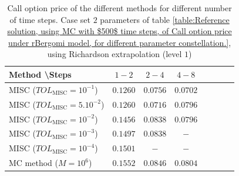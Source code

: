 \begin{table}[h!]
	\centering
	\begin{tabular}{l*{6}{c}r}
		Method \textbackslash  Steps    &$1-2$         & $2-4$ & $4-8$ \\
		\hline
		MISC ($TOL_{\text{MISC}}=10^{-1}$)  &$0.1260$ & $0.0756$ & $0.0702$   \\
		MISC ($TOL_{\text{MISC}}=5.10^{-2}$)   &$0.1260$ & $0.0716$ & $0.0796$    \\
		MISC ($TOL_{\text{MISC}}=10^{-2}$)  &$0.1456$ & $0.0838$ & $0.0796$  \\	
		MISC ($TOL_{\text{MISC}}=10^{-3}$)  &$0.1497$ & $0.0838$ & $-$ \\
		
		MISC ($TOL_{\text{MISC}}=10^{-4}$)  &$0.1501$ & $-$ & $-$ \\
		\hline
		MC method ($M=10^{6}$)   & $0.1552 $  & $0.0846 $  & $0.0804$  \\		
		\hline
	\end{tabular}
	\caption{Call option price of the different methods for different number of time steps. Case set $2$ parameters of table \ref{table:Reference solution, using MC with $500$ time steps, of Call option price under rBergomi model, for different parameter constellation.}, using Richardson extrapolation (level $1$)}
	\label{table:  Call option price of the different methods for different number of time steps. Case set $2$ parameter, using Richardson extrapolation (level $1$),linear}
\end{table}



